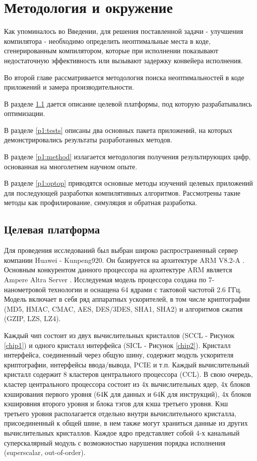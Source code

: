\chapter{Методология и окружение}\label{ch:chMethod}
Как упоминалось во Введении, для решения поставленной задачи - улучшения компилятора - необходимо определить неоптимальные места в коде, сгенерированным компилятором, которые при исполнении показывают недостаточную эффективность или вызывают задержку конвейера исполнения.

Во второй главе рассматривается методология поиска неоптимальностей в коде приложений и замера производительности. 

В разделе \ref{p1:platform} дается описание целевой платформы, под которую разрабатывались оптимизации.

В разделе  \ref{p1:tests} описаны два основных пакета приложений, на которых демонстрировались результаты разработанных методов.

В разделе \ref{p1:method} излагается методология получения результирующих цифр, основанная на многолетнем научном опыте.

В разделе \ref{p1:optop} приводятся основные методы изучений целевых приложений для последующей разработки компилятивных алгоритмов. Рассмотрены такие методы как профилирование, симуляция и обратная разработка.


\section{Целевая платформа}\label{p1:platform}

Для проведения исследований был выбран широко распространенный сервер компании Huawei - Kunpeng920. Он базируется на архитектуре ARM V8.2-A \cite{reid2016trustworthy,xia2021kunpeng}.  Основным конкурентом данного процессора на архитектуре ARM является Ampere Altra Server \cite{cha2021ampere}.  Исследуемая модель процессора создана по 7-нанометровой технологии и оснащена 64 ядрами с тактовой частотой 2.6 ГГц. Модель включает в себя  ряд аппаратных ускорителей, в том числе криптографии (MD5, HMAC, CMAC, AES, DES/3DES,  SHA1, SHA2) и  алгоритмов сжатия (GZIP, LZS, LZ4). 

Каждый чип состоит из двух вычислительных кристаллов (SCCL - Рисунок \ref{chip1})  и одного кристалл интерфейса (SICL - Рисунок \ref{chip2}). Кристалл интерфейса, соединенный через общую шину, содержит модуль ускорителя криптографии, интерфейсы ввода/вывода, PCIE и т.п. Каждый вычислительный кристалл содержит 8 кластеров центрального процессора (CCL). В свою очередь, кластер центрального процессора состоит из 4х вычислительных ядер, 4х блоков кэширования первого уровня (64К для данных и 64К для инструкций), 4х блоков кэшировния второго уровня и блока тэгов для кэша третьего уровня. Кэш третьего уровня располагается отдельно внутри вычислительного кристалла, присоединенный к общей шине, в нем также могут храниться данные из других вычислительных кристаллов. Каждое ядро представляет собой 4-х канальный суперскалярный модуль с возможностью нарушения порядка исполнения (superscalar, out-of-order).

